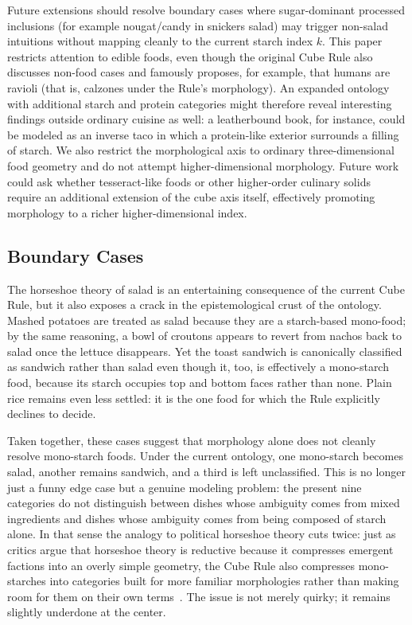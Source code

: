 Future extensions should resolve boundary cases where sugar-dominant processed inclusions (for example nougat/candy in snickers salad) may trigger non-salad intuitions without mapping cleanly to the current starch index $k$.
This paper restricts attention to edible foods, even though the original Cube Rule also discusses non-food cases and famously proposes, for example, that humans are ravioli (that is, calzones under the Rule's morphology).
An expanded ontology with additional starch and protein categories might therefore reveal interesting findings outside ordinary cuisine as well: a leatherbound book, for instance, could be modeled as an inverse taco in which a protein-like exterior surrounds a filling of starch.
We also restrict the morphological axis to ordinary three-dimensional food geometry and do not attempt higher-dimensional morphology.
Future work could ask whether tesseract-like foods or other higher-order culinary solids require an additional extension of the cube axis itself, effectively promoting morphology to a richer higher-dimensional index.

\subsection{Boundary Cases}

The horseshoe theory of salad is an entertaining consequence of the current Cube Rule, but it also exposes a crack in the epistemological crust of the ontology. Mashed potatoes are treated as salad because they are a starch-based mono-food; by the same reasoning, a bowl of croutons appears to revert from nachos back to salad once the lettuce disappears. Yet the toast sandwich is canonically classified as sandwich rather than salad even though it, too, is effectively a mono-starch food, because its starch occupies top and bottom faces rather than none. Plain rice remains even less settled: it is the one food for which the Rule explicitly declines to decide.

Taken together, these cases suggest that morphology alone does not cleanly resolve mono-starch foods. Under the current ontology, one mono-starch becomes salad, another remains sandwich, and a third is left unclassified. This is no longer just a funny edge case but a genuine modeling problem: the present nine categories do not distinguish between dishes whose ambiguity comes from mixed ingredients and dishes whose ambiguity comes from being composed of starch alone. In that sense the analogy to political horseshoe theory cuts twice: just as critics argue that horseshoe theory is reductive because it compresses emergent factions into an overly simple geometry, the Cube Rule also compresses mono-starches into categories built for more familiar morphologies rather than making room for them on their own terms~\cite{horseshoe}. The issue is not merely quirky; it remains slightly underdone at the center.

